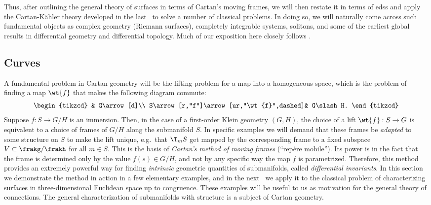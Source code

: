 Thus, after outlining the general theory of surfaces in terms of Cartan's moving frames, we will then restate it in terms of \glspl{eds} and apply the Cartan-K\"ahler theory developed in the last \sect\ to solve a number of classical problems. In doing so, we will naturally come across such fundamental objects as complex geometry (Riemann surfaces), completely integrable systems, solitons, and some of the earliest global results in differential geometry and differential topology. Much of our exposition here closely follows \cite{Ivey}.




\subsection{Curves}

A fundamental problem in Cartan geometry will be the lifting problem for a map into a homogeneous space, which is the problem of finding a map $\wt{f}$ that makes the following diagram commute:
\[\begin{tikzcd}
                                    & G\arrow[d]\\
    S\arrow[r,"f"]\arrow[ur,"\wt{f}",dashed]& G\slash H.
\end{tikzcd}\]
Suppose $f:S\to G\slash H$ is an immersion. Then, in the case of a first-order Klein geometry $(G,H)$, the choice of a lift $\wt{f}:S\to G$ is equivalent to a choice of frames of $G\slash H$ along the submanifold $S$. In specific examples we will demand that these frames be \emph{adapted} to some structure on $S$ to make the lift unique, e.g.\ that $\T_mS$ get mapped by the corresponding frame to a fixed subspace $V\subset \frakg\slash\frakh$ for all $m\in S$. This is the basis of \emph{Cartan's method of moving frames} (``rep\`ere mobile''). Its power is in the fact that the frame is determined only by the value $f(s)\in G\slash H$, and not by any specific way the map $f$ is parametrized. Therefore, this method provides an extremely powerful way for finding \emph{intrinsic} geometric quantities of submanifolds, called \emph{differential invariants}. In this section we demonstrate the method in action in a few elementary examples, and in the next \subsect\ we apply it to the classical problem of characterizing surfaces in three-dimensional Euclidean space up to congruence. These examples will be useful to us as motivation for the general theory of connections. The general characterization of submanifolds with structure is a subject of Cartan geometry.

